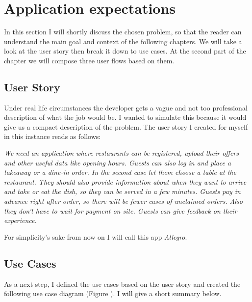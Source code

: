 \chapter{Application expectations}\label{Ch1}
In this section I will shortly discuss the chosen problem, so that the reader can understand the main goal and context of the following chapters. We will take a look at the user story then break it down to use cases. At the second part of the chapter we will compose three user flows based on them.
\section{User Story}

Under real life circumstances the developer gets a vague and not too professional description of what the job would be. I wanted to simulate this because it would give us a compact description of the problem. The user story I created for myself in this instance reads as follows: 

 \emph{
 	We need an application where restaurants can be registered, upload their offers and other useful data like opening hours. Guests can also log in and place a takeaway or a dine-in order. In the second case let them choose a table at the restaurant. They should also provide information about when they want to arrive and take or eat the dish, so they can be served in a few minutes. Guests pay in advance right after order, so there will be fewer cases of unclaimed orders. Also they don't have to wait for payment on site. Guests can give feedback on their experience.
 } 

For simplicity's sake from now on I will call this app \emph{Allegro}.

\section{Use Cases}
 As a next step, I defined the use cases based on the user story and created the following use case diagram (Figure ). I will give a short summary below. 
 
